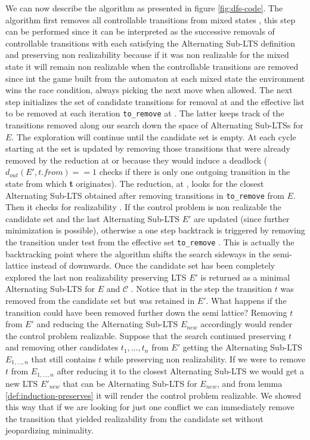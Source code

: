 We can now describe the algorithm as
presented in figure \ref{fig:dfs-code}. The algorithm first removes all controllable transitions from
mixed states , this step can be performed since it
can be interpreted as the successive removals of controllable 
transitions with each satisfying the Alternating Sub-LTS definition 
and preserving non realizability because if it was non realizable
for the mixed state it will remain non realizable when the controllable transitions are removed since int the game built from
the automaton at each mixed state the environment
wins the race condition, always picking the next move when allowed.
The next step initializes the set of 
candidate transitions
for removal at  and the effective list
to be removed at each iteration \texttt{to\_remove} at
.  The latter keeps track of the transitions
removed along our search down the space of
Alternating Sub-LTSs for $E$.  The exploration
will continue until the candidate set is empty.
At each cycle starting at  the set is updated  by 
removing those transitions that were already removed by the reduction
at  or because they would induce a deadlock 
($d_{out}(E', t.from) == 1$ checks if there is only one
outgoing transition in the state from which \textbf{t} originates).
The
reduction, at , looks for the closest
Alternating Sub-LTS obtained after removing 
transitions in \texttt{to\_remove} from $E$.
Then it checks for realizability .  If the control problem is non
realizable the candidate set and the last 
Alternating Sub-LTS $E'$ are updated (since further minimization is 
possible), otherwise a one step backtrack
is triggered by removing the transition under test from
the effective set \texttt{to\_remove} .
This is actually the backtracking point where the algorithm
shifts the search sideways in the semi-lattice instead of downwards.
Once the candidate set has been completely explored
the last non realizability preserving LTS $E'$ is
returned as a minimal Alternating Sub-LTS
for $E$ and $\mathcal{C}$ .
Notice that
in the step  the transition $t$ was removed
from the candidate set but was retained in $E'$.  What happens if
the transition could have been removed further down the semi lattice?  Removing $t$ from $E'$ and reducing the Alternating Sub-LTS 
$E_{new}$ accordingly would render the control problem realizable.  Suppose that
the search continued preserving $t$ and removing other candidates
$t_1, \ldots, t_n$ from $E'$ getting the Alternating Sub-LTS
$E_{1,\ldots,n}$ that still contains $t$ while preserving non realizability.
If we were to remove $t$ from $E_{1,\ldots,n}$ after reducing it
to the closest Alternating Sub-LTS we would get a new LTS
$E'_{new}$ that can be Alternating Sub-LTS for $E_{new}$, and from lemma
\ref{def:induction-preserves} it will render the control problem
realizable.  We showed this way that if we are looking for just one
conflict we can immediately remove the transition that yielded realizability 
from the candidate set without jeopardizing minimality.
%


